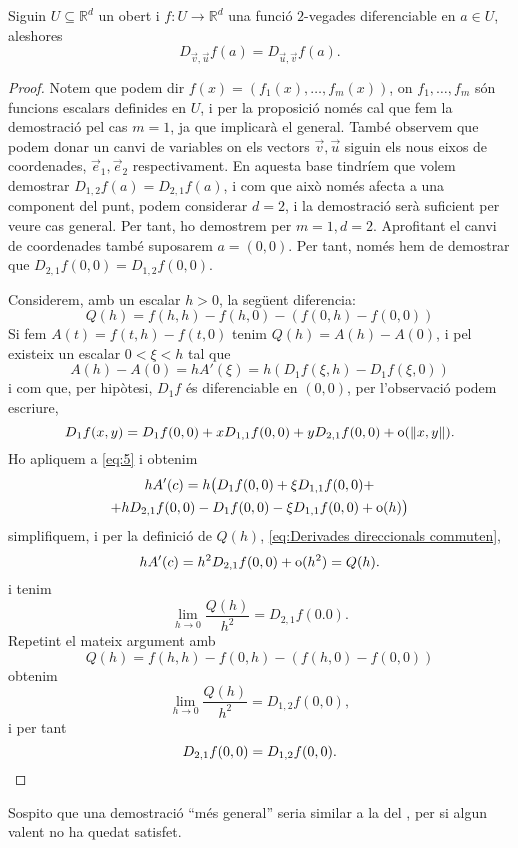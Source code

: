 \documentclass[../Apunts.tex]{subfiles}
\begin{document}
	\begin{theorem}Siguin \(U\subseteq\mathbb{R}^{d}\) un obert i \(f\colon U\to\mathbb{R}^{d}\) una funció \(2\)-vegades diferenciable en \(a\in U\), aleshores
		\[D_{\vec{v},\vec{u}}f(a)=D_{\vec{u},\vec{v}}f(a).\]
		\begin{proof}
			Notem que podem dir \(f(x)=(f_{1}(x),\dots,f_{m}(x))\), on \(f_{1},\dots,f_{m}\) són funcions escalars definides en \(U\), i per la proposició  només cal que fem la demostració pel cas \(m=1\), ja que implicarà el general. També observem que podem donar un canvi de variables on els vectors \(\vec{v},\vec{u}\) siguin els nous eixos de coordenades, \(\vec{e}_{1},\vec{e}_{2}\) respectivament. En aquesta base tindríem que volem demostrar \(D_{1,2}f(a)=D_{2,1}f(a)\), i com que això només afecta a una component del punt, podem considerar \(d=2\), i la demostració serà suficient per veure cas general. Per tant, ho demostrem per \(m=1,d=2\). Aprofitant el canvi de coordenades també suposarem \(a=(0,0)\). Per tant, només hem de demostrar que \(D_{2,1}f(0,0)=D_{1,2}f(0,0)\).
			
			Considerem, amb un escalar \(h>0\), la següent diferencia:
			\begin{equation}\label{eq:Derivades direccionals commuten}
			Q(h)=f(h,h)-f(h,0)-(f(0,h)-f(0,0))
			\end{equation}
			Si fem \(A(t)=f(t,h)-f(t,0)\) tenim \(Q(h)=A(h)-A(0)\), i pel  existeix un escalar \(0<\xi<h\) tal que
			\begin{equation}\label{eq:5}
			A(h)-A(0)=hA'(\xi)=h(D_{1}f(\xi,h)-D_{1}f(\xi,0))
			\end{equation}
			i com que, per hipòtesi, \(D_{1}f\) és diferenciable en \((0,0)\), per l'observació  podem escriure,
			\[D_{1}f(x,y)=D_{1}f(0,0)+xD_{1,1}f(0,0)+yD_{2,1}f(0,0)+\omicron(\norm{x,y}).\]
			Ho apliquem a \eqref{eq:5} i obtenim
			\begin{multline*}
			hA'(c)=h\big(D_{1}f(0,0)+\xi D_{1,1}f(0,0)+\\+hD_{2,1}f(0,0)-D_{1}f(0,0)-\xi D_{1,1}f(0,0)+\operatorname{o}(h)\big)
			\end{multline*}
			simplifiquem, i per la definició de \(Q(h)\), \eqref{eq:Derivades direccionals commuten},
			\[hA'(c)=h^{2}D_{2,1}f(0,0)+\operatorname{o}(h^{2})=Q(h).\]
			i tenim
			\[\lim_{h\to0}\frac{Q(h)}{h^{2}}=D_{2,1}f(0.0).\]
			Repetint el mateix argument amb
			\[Q(h)=f(h,h)-f(0,h)-(f(h,0)-f(0,0))\]
			obtenim
			\[\lim_{h\to0}\frac{Q(h)}{h^{2}}=D_{1,2}f(0,0),\]
			i per tant
			\[D_{2,1}f(0,0)=D_{1,2}f(0,0).\qedhere\]
		\end{proof}
		\begin{note}
			Sospito que una demostració ``més general'' seria similar a la del , per si algun valent no ha quedat satisfet.
		\end{note}
	\end{theorem}
\end{document}

